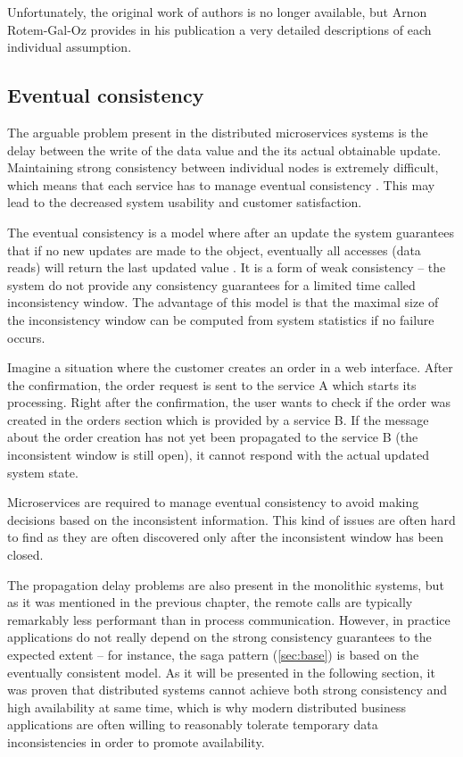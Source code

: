 \documentclass[oneside,
  digital, %
  table,   %
  lof,     %
  lot,     %
]{fithesis3}
\begin{document}
\noindent
Unfortunately, the original work of authors is no longer available, but Arnon Rotem-Gal-Oz provides in his publication \cite{fallacies} a very detailed descriptions of each individual assumption.

\subsection{Eventual consistency}
\label{sec:eventual-consistency}

The arguable problem present in the distributed microservices systems is the delay between the write of the data value and the its actual obtainable update. Maintaining strong consistency between individual nodes is extremely difficult, which means that each service has to manage eventual consistency \cite{ms_tradeoffs}. This may lead to the decreased system usability and customer satisfaction.

The eventual consistency is a model where after an update the system guarantees that if no new updates are made to the object, eventually all accesses (data reads) will return the last updated value \cite{event_consist}. It is a form of weak consistency -- the system do not provide any consistency guarantees for a limited time called inconsistency window. The advantage of this model is that the maximal size of the inconsistency window can be computed from system statistics if no failure occurs.

Imagine a situation where the customer creates an order in a web interface. After the confirmation, the order request is sent to the service A which starts its processing. Right after the confirmation, the user wants to check if the order was created in the orders section which is provided by a service B. If the message about the order creation has not yet been propagated to the service B (the inconsistent window is still open), it cannot respond with the actual updated system state. 

Microservices are required to manage eventual consistency to avoid making decisions based on the inconsistent information. This kind of issues are often hard to find as they are often discovered only after the inconsistent window has been closed.

The propagation delay problems are also present in the monolithic systems, but as it was mentioned in the previous chapter, the remote calls are typically remarkably less performant than in process communication. However, in practice applications do not really depend on the strong consistency guarantees to the expected extent -- for instance, the saga pattern (\ref{sec:base}) is based on the eventually consistent model. As it will be presented in the following section, it was proven that distributed systems cannot achieve both strong consistency and high availability at same time, which is why modern distributed business applications are often willing to reasonably tolerate temporary data inconsistencies in order to promote availability.
\end{document}
